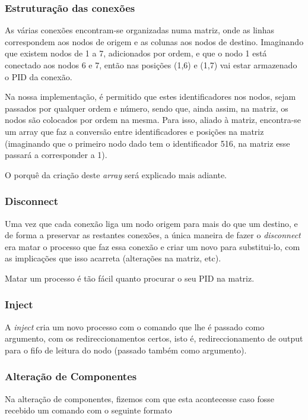 \documentclass[a4paper]{article}
\begin{document}
\subsubsection{Estruturação das conexões}

As várias conexões encontram-se organizadas numa matriz, onde as linhas correspondem aos nodos de origem e as colunas aos nodos de destino. Imaginando que existem nodos de 1 a 7, adicionados por ordem, e que o nodo 1 está conectado aos nodos 6 e 7, então nas posições (1,6) e (1,7) vai estar armazenado o PID da conexão.

Na nossa implementação, é permitido que estes identificadores nos nodos, sejam passados por qualquer ordem e número, sendo que, ainda assim, na matriz, os nodos são colocados por ordem na mesma. Para isso, aliado à matriz, encontra-se um array que faz a conversão entre identificadores e posições na matriz (imaginando que o primeiro nodo dado tem o identificador 516, na matriz esse passará a corresponder a 1).

O porquê da criação deste \textit{array} será explicado mais adiante.

\subsubsection{Disconnect}

Uma vez que cada conexão liga um nodo origem para mais do que um destino, e de forma a preservar as restantes conexões, a única maneira de fazer o \textit{disconnect} era matar o processo que faz essa conexão e criar um novo para substitui-lo, com as implicações que isso acarreta (alterações na matriz, etc).

Matar um processo é tão fácil quanto procurar o seu PID na matriz.

\subsubsection{Inject}

A \textit{inject} cria um novo processo com o comando que lhe é passado como argumento, com os redireccionamentos certos, isto é, redireccionamento de output para o fifo de leitura do nodo (passado também como argumento). 

\subsubsection{Alteração de Componentes}

Na alteração de componentes, fizemos com que esta acontecesse caso fosse recebido um comando com o seguinte formato
\end{document}
